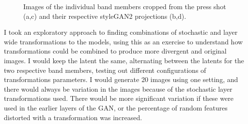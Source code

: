 \begin{figure}[!htbp]
    \hfill
    \hfill
    \hfill
    \caption{Images of the individual band members cropped from the press shot (a,c) and their respective styleGAN2 projections (b,d). }
    \label{fig:c7:0171-crop-embed}
 \end{figure}


I took an exploratory approach to finding combinations of stochastic and layer wide transformations to the models, using this as an exercise to understand how transformations could be combined to produce more divergent and original images. 
I would keep the latent the same, alternating between the latents for the two respective band members, testing out different configurations of transformations parameters. 
I would generate 20 images using one setting, and there would always be variation in the images because of the stochastic layer transformations used. 
There would be more significant variation if these were used in the earlier layers of the GAN, or the percentage of random features distorted with a transformation was increased.

